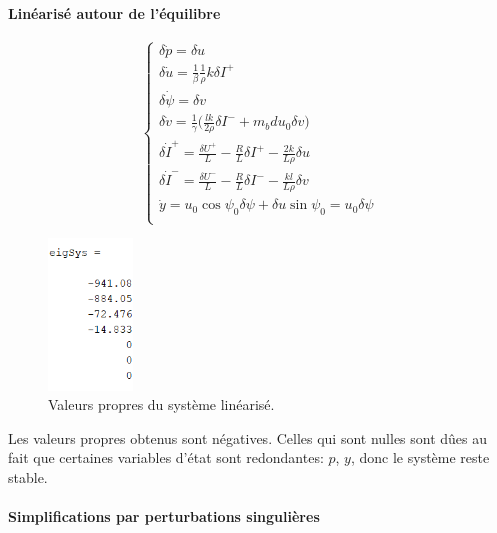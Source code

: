\documentclass{report}
\begin{document}
\paragraph{Linéarisé autour de l'équilibre}

\begin{equation*}
    \begin{cases}
        \delta{\dot p} = \delta u \\
        \delta{\dot u} = \frac{1}{\beta}\frac{1}{\rho}k\delta I^{+} \\
        \delta{\dot \psi} = \delta v \\
        \delta{\dot v} = \frac{1}{\gamma}\big( \frac{lk}{2\rho}\delta I^{-} + m_bd u_0 \delta v \big) \\
        \delta{\dot I^{+}} = \frac{\delta U^{+}}{L} - \frac{R}{L}\delta I^{+} - \frac{2k}{L\rho}\delta u \\
        \delta{\dot I^{-}} = \frac{\delta U^{-}}{L} - \frac{R}{L}\delta I^{-} - \frac{kl}{L\rho}\delta v \\
        \dot{y} = u_0\cos\psi_0 \delta \psi + \delta u \sin\psi_0 = u_0 \delta \psi \\
    \end{cases}
\end{equation*}

\begin{figure}[h]  %
    \centering
    \includegraphics[width=0.2\textwidth]{figures/eigSys.png}
    \caption{Valeurs propres du système linéarisé.}
\end{figure}

Les valeurs propres obtenus sont négatives. Celles qui sont nulles sont
dûes au fait que certaines variables d'état sont redondantes: $p$, $y$,
donc le système reste stable.


\paragraph{Simplifications par perturbations singulières}
\end{document}
